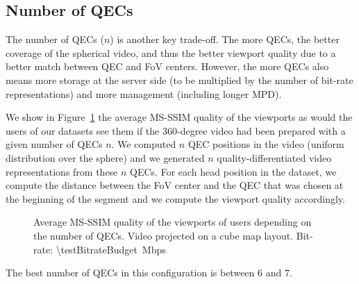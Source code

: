 
\subsection{Number of \acp{QEC}}

The number of QECs ($n$) is another key trade-off. The more QECs, the better coverage
of the spherical video, and thus the better viewport quality due to a better match
between QEC and FoV centers. However, the more QECs also means more storage
at the server side (to be multiplied by the number of bit-rate representations) and
more management (including longer \ac{MPD}).

We show in Figure~\ref{fig:QEC} the average \acs{MS-SSIM} quality of the viewports as
would the users of our datasets see them if the 360-degree video had been prepared
with a given number of QECs $n$.
We computed $n$ QEC positions in the video (uniform distribution over the sphere) and we generated $n$ quality-differentiated video representations from these $n$ QECs.
For each head position in the dataset, we compute the distance between the
FoV center and the QEC that was chosen at the beginning of the segment and we compute
the viewport quality accordingly.

\begin{figure}[htbp]
\centering

\caption{Average \acs{MS-SSIM} quality of the viewports of users depending
on the number of QECs. Video projected on a cube map layout.
Bit-rate: \SI{\testBitrateBudget}{\mega bps}}
\label{fig:QEC}
\end{figure}

The best number of QECs in this configuration is between $6$ and $7$.
